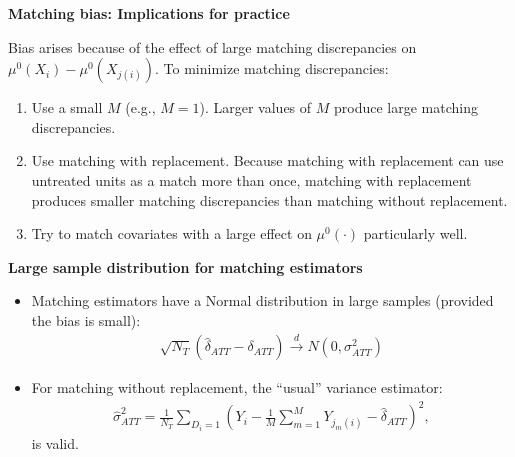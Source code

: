 \documentclass[notes=show]{beamer}
\begin{document}
\begin{frame}[plain]
	\begin{center}
	\textbf{Matching bias: Implications for practice}
	\end{center}
	
Bias arises because of the effect of large matching discrepancies on $\mu^0(X_i) - \mu^0(X_{j(i)})$. To minimize matching discrepancies:
	\begin{enumerate}
	\item Use a small $M$ (e.g., $M=1$). Larger values of $M$ produce large matching discrepancies.
	\item Use matching with replacement.  Because matching with replacement can use untreated units as a match more than once, matching with replacement produces smaller matching discrepancies than matching without replacement.
	\item Try to match covariates with a large effect on $\mu^0(\cdot)$ particularly well.
	\end{enumerate}
\end{frame}

\begin{frame}[plain]
	\begin{center}
	\textbf{Large sample distribution for matching estimators}
	\end{center}
	
	\begin{itemize}
	\item Matching estimators have a Normal distribution in large samples (provided the bias is small):
		\begin{eqnarray*}
		\sqrt{N_T} (\widehat{\delta}_{ATT} - \delta_{ATT}) \xrightarrow{d} N(0,\sigma^2_{ATT})
		\end{eqnarray*}
	\item For matching without replacement, the ``usual'' variance estimator:
		\begin{eqnarray*}
		\widehat{\sigma}^2_{ATT} = \frac{1}{N_T} \sum_{D_i=1} \left( Y_i - \frac{1}{M} \sum_{m=1}^M Y_{j_m(i)} - \widehat{\delta}_{ATT} \right)^2,
		\end{eqnarray*}is valid.
	\end{itemize}
\end{frame}
\end{document}
